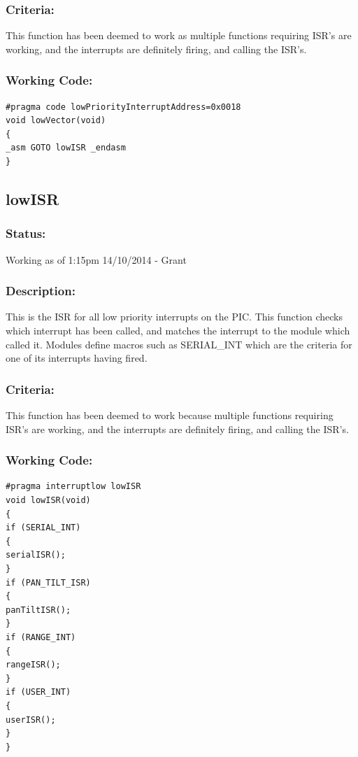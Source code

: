 \documentclass[]{report}
\begin{document}
\subsubsection{Criteria:}
This function has been deemed to work as multiple functions requiring ISR's are working, and the interrupts are definitely firing, and calling the ISR's.

\subsubsection{Working Code:}
\begin{lstlisting}
#pragma code lowPriorityInterruptAddress=0x0018
void lowVector(void)
{
_asm GOTO lowISR _endasm
}
\end{lstlisting}

\subsection{lowISR}
\subsubsection{Status:}
Working as of 1:15pm 14/10/2014 - Grant

\subsubsection{Description:}
This is the ISR for all low priority interrupts on the PIC. This function checks which interrupt has been called, and matches the interrupt to the module which called it. Modules define macros such as SERIAL\_INT which are the criteria for one of its interrupts having fired.

\subsubsection{Criteria:}
This function has been deemed to work because multiple functions requiring ISR's are working, and the interrupts are definitely firing, and calling the ISR's.

\subsubsection{Working Code:}
\begin{lstlisting}
#pragma interruptlow lowISR
void lowISR(void)
{
if (SERIAL_INT)
{
serialISR();
}
if (PAN_TILT_ISR)
{
panTiltISR();
}
if (RANGE_INT)
{
rangeISR();
}
if (USER_INT)
{
userISR();
}
}
\end{lstlisting}
\end{document}
